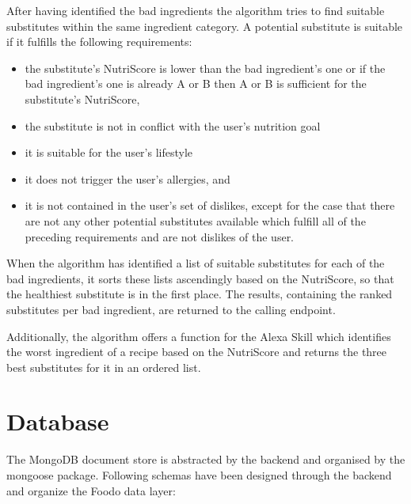 \bigskip \bigskip
              
After having identified the bad ingredients the algorithm tries to find suitable substitutes within the same ingredient category. A potential substitute is suitable if it fulfills the following requirements:
\begin{itemize}
	\itemsep-0.5em 
	\item  the substitute's NutriScore is lower than the bad ingredient's one or if the bad ingredient's one is already A or B then A or B is sufficient for the substitute's NutriScore,
	\item the substitute is not in conflict with the user's nutrition goal
	\item it is suitable for the user's lifestyle
	\item it does not trigger the user's allergies, and
	\item it is not contained in the user's set of dislikes, except for the case that there are not any other potential substitutes available which fulfill all of the preceding requirements and are not dislikes of the user.
\end{itemize}
When the algorithm has identified a list of suitable substitutes for each of the bad ingredients, it sorts these lists ascendingly based on the NutriScore, so that the healthiest substitute is in the first place. The results, containing the ranked substitutes per bad ingredient, are returned to the calling endpoint.

Additionally, the algorithm offers a function for the Alexa Skill which identifies the worst ingredient of a recipe based on the NutriScore and returns the three best substitutes for it in an ordered list. 

\section{Database}
The MongoDB document store is abstracted by the backend and organised by the mongoose package. Following schemas have been designed through the backend and organize the Foodo data layer: 

